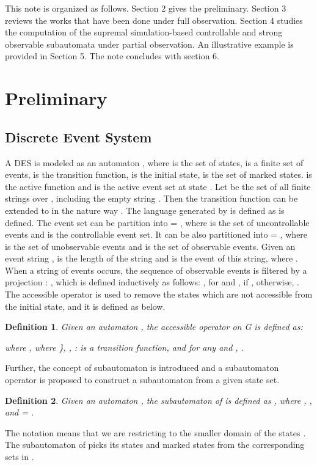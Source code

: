\documentclass[12pt,draftcls,onecolumn]{IEEEtran}
\newtheorem{Definition}{Definition}
\begin{document}
This note is organized as follows. Section 2 gives the
preliminary. Section 3 reviews the works that have been done under
full observation. Section 4 studies the computation of the
supremal simulation-based controllable and strong observable
subautomata under partial observation. An illustrative example is
provided in Section 5. The note concludes with section 6.


\section{Preliminary}
\subsection{Discrete Event System}
A DES is modeled as an automaton , where  is the set of states,  is a finite set
of events,  is the
transition function,  is the initial state, 
is the set of marked states.  is
the active function and  is the active event set at
state . Let  be the set of all finite strings over
, including the empty string . Then the
transition function  can be extended to  in the nature way \cite{cc}. The
language generated by  is defined as  is defined. The event set can be
partition into  = ,
where  is the set of uncontrollable events and
 is the controllable event set. It can be also
partitioned into  = ,
where  is the set of unobservable events and
 is the set of observable events. Given an event
string ,  is the length of the string and
 is the  event of this string, where . When a string of events occurs, the sequence of observable
events is filtered by a projection : , which is defined inductively as follows:
, for  and ,  if ,
otherwise, . The accessible operator  is used
to remove the states which are not accessible from the initial
state, and it is defined as below.






\begin{Definition}
Given an automaton , the
accessible operator on G is defined as:

where , where
 \}, , :
 is a transition function,
and for any  and , .
\end{Definition}


Further, the concept of subautomaton is introduced and a
subautomaton operator is proposed to construct a subautomaton from
a given state set.


\begin{Definition}
Given an automaton , the
subautomaton of  is defined as , where , ,
and  = .
\end{Definition}
The notation 
means that we are restricting  to the smaller domain of
the states . The subautomaton of  picks its states and
marked states from the corresponding sets in .
\end{document}
